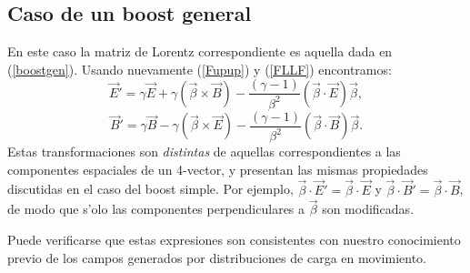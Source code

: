 \subsection{Caso de un boost general}
En este caso la matriz de Lorentz correspondiente es aquella dada en
(\ref{boostgen}). Usando nuevamente (\ref{Fupup}) y (\ref{FLLF}) encontramos:
\begin{equation}
\boxed{\vec{E}'=\gamma \vec{E}+\gamma \left(\vec{\beta}\times
\vec{B}\right) -\frac{(\gamma -1)}{\beta^2}\left( \vec{\beta}\cdot
\vec{E}\right) \vec{\beta} ,} \label{TLE}
\end{equation}
\begin{equation}
\boxed{\vec{B}'=\gamma \vec{B}-\gamma \left(\vec{\beta}\times
\vec{E}\right) -\frac{(\gamma -1)}{\beta^2}\left( \vec{\beta}\cdot
\vec{B}\right) \vec{\beta}.} \label{TLB}
\end{equation}
Estas transformaciones son \textit{distintas} de aquellas correspondientes a las
componentes espaciales de un 4-vector, y presentan las mismas propiedades
discutidas en el caso del boost simple. Por ejemplo,
$\vec{\beta}\cdot\vec{E}'=\vec{\beta}\cdot\vec{E}$ y
$\vec{\beta}\cdot\vec{B}'=\vec{\beta}\cdot\vec{B}$, de modo que s'olo las
componentes perpendiculares a $\vec{\beta}$ son modificadas.

Puede verificarse que estas expresiones son consistentes con nuestro conocimiento previo de los campos generados por distribuciones de carga en movimiento.

